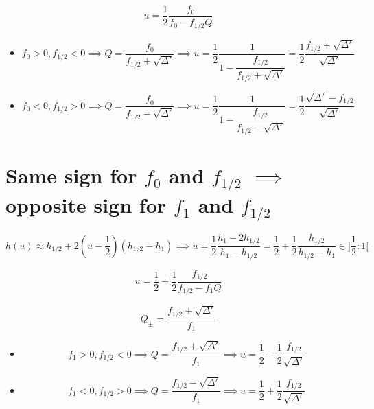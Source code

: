 \documentclass[aps,11pt]{revtex4}
\begin{document}
 $$
 	u =  \frac{1}{2}\dfrac{f_0}{f_0 - f_{1/2}Q}
 $$
 
 \begin{itemize}
 \item 
 $$
 	f_0>0, f_{1/2}<0 \implies Q = \frac{f_0}{f_{1/2}+\sqrt{\Delta'}} 
	\implies u = \dfrac{1}{2} \dfrac{1}{ 1 - \dfrac{f_{1/2}}{f_{1/2}+\sqrt{\Delta'}} } = \dfrac{1}{2} \dfrac{f_{1/2}+\sqrt{\Delta'}}{\sqrt{\Delta'}}
$$


\item 
 $$
 	f_0<0, f_{1/2}>0 \implies Q = \frac{f_0}{f_{1/2}-\sqrt{\Delta'}} 
	\implies u = \dfrac{1}{2} \dfrac{1}{ 1 - \dfrac{f_{1/2}}{f_{1/2}-\sqrt{\Delta'}} } = \dfrac{1}{2}  \dfrac{\sqrt{\Delta'}-f_{1/2}}{\sqrt{\Delta'}}
$$
 \end{itemize}
 
 \section{Same sign for $f_0$ and $f_{1/2}$ $\implies$ opposite sign for $f_1$ and $f_{1/2}$}

$$
	h(u) \approx h_{1/2} + 2(u-\dfrac{1}{2})(h_{1/2}-h_1) \implies u = \dfrac{1}{2}\dfrac{h_1 - 2h_{1/2}}{h_1-h_{1/2}}
	= \frac{1}{2} + \frac{1}{2} \dfrac{h_{1/2}}{h_{1/2}-h_1} \in ]\frac{1}{2}:1[
$$
 
$$
	u = \frac{1}{2} + \frac{1}{2} \dfrac{f_{1/2}}{f_{1/2}-f_1Q}
$$ 
 
$$
	Q_\pm = \dfrac{ f_{1/2} \pm \sqrt{\Delta'} }{f_1}
$$
 
\begin{itemize}
\item
$$
	f_1 >0 , f_{1/2} <0 \implies Q = \dfrac{ f_{1/2} + \sqrt{\Delta'} }{f_1}
	\implies u = \frac{1}{2} - \frac{1}{2} \dfrac{f_{1/2}}{\sqrt{\Delta'}}
$$

\item
$$
	f_1 < 0, f_{1/2} > 0 \implies Q = \dfrac{ f_{1/2} - \sqrt{\Delta'} }{f_1} \implies u = \frac{1}{2} + \frac{1}{2} \dfrac{f_{1/2}}{\sqrt{\Delta'}}
$$
\end{itemize} 
  
  
\end{document}

